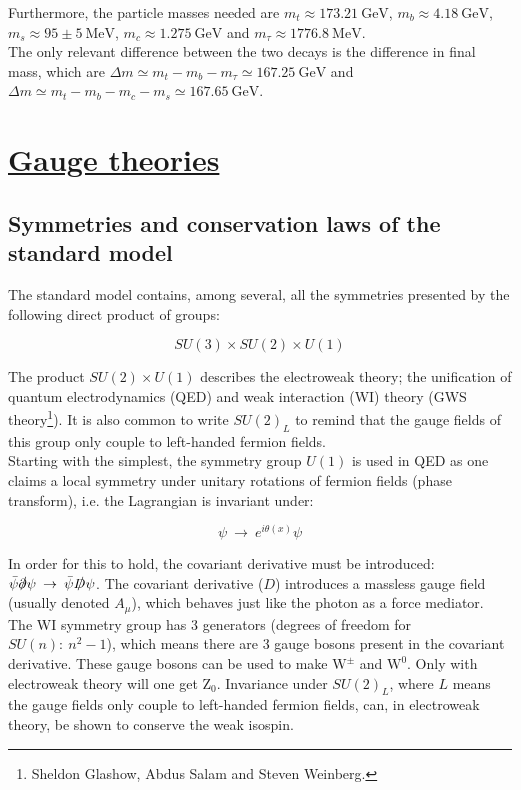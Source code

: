 \documentclass[11pt,a4paper]{article}
\begin{document}
Furthermore, the particle masses needed are $m_t \approx 173.21\:\text{GeV}$, $m_b \approx 4.18\:\text{GeV}$, $m_s \approx 95 \pm 5 \:\text{MeV}$, $m_c \approx 1.275\:\text{GeV}$ and $m_\tau \approx 1776.8\:\text{MeV}$.\\
The only relevant difference between the two decays is the difference in final mass, which are $\Delta m \simeq m_t - m_b - m_\tau \simeq 167.25\:\text{GeV}$ and $\Delta m \simeq m_t - m_b - m_c - m_s \simeq 167.65\:\text{GeV}$.

\section{\underline{Gauge theories}}
\subsection{Symmetries and conservation laws of the standard model}
The standard model contains, among several, all the symmetries presented by the following direct product of groups:

\begin{equation}
	SU(3) \times SU(2) \times U(1)
\end{equation}

The product $SU(2) \times U(1)$ describes the electroweak theory; the unification of quantum electrodynamics (QED) and weak interaction (WI) theory (GWS theory\footnote{Sheldon Glashow, Abdus Salam and Steven Weinberg.}). It is also common to write $SU(2)_L$ to remind that the gauge fields of this group only couple to left-handed fermion fields.\\

Starting with the simplest, the symmetry group $U(1)$ is used in QED as one claims a local symmetry under unitary rotations of fermion fields (phase transform), i.e. the Lagrangian is invariant under:

\begin{equation}
	\psi \:\rightarrow\: e^{i\theta(x)}\psi
\end{equation} 

In order for this to hold, the covariant derivative must be introduced: $\bar{\psi}\slashed\partial\psi \:\rightarrow\: \bar{\psi}\slashed D\psi$. The covariant derivative ($D$) introduces a massless gauge field (usually denoted $A_\mu$), which behaves just like the photon as a force mediator.\\

The WI symmetry group has 3 generators (degrees of freedom for $SU(n):\:n^2-1$), which means there are 3 gauge bosons present in the covariant derivative. These gauge bosons can be used to make $\text{W}^\pm$ and $\text{W}^0$. Only with electroweak theory will one get $\text{Z}_ 0$. Invariance under $SU(2)_L$, where $L$ means the gauge fields only couple to left-handed fermion fields, can, in electroweak theory, be shown to conserve the weak isospin.\\
\end{document}
